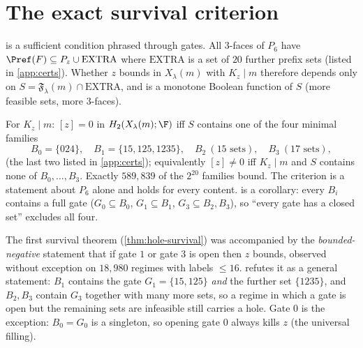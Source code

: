 \section{The exact survival criterion}
 is a sufficient condition phrased through gates. All 3-faces of $P_6$ have $\Pref(F)\subseteq P_z\cup\mathrm{EXTRA}$ where $\mathrm{EXTRA}$ is a set of $20$ further prefix sets (listed in \cref{app:certs}). Whether $z$ bounds in $X_\lambda(m)$ with $K_z\mid m$ therefore depends only on $S=\mathfrak F_\lambda(m)\cap\mathrm{EXTRA}$, and is a monotone Boolean function of $S$ (more feasible sets, more $3$-faces).
\begin{theorem}\label{thm:exact-survival}
For $K_z\mid m$: $[z]=0$ in $H_2(X_\lambda(m);\F)$ iff $S$ contains one of the four minimal families
\[
B_0=\{024\},\quad B_1=\{15,125,1235\},\quad B_2\ (15\text{ sets}),\quad B_3\ (17\text{ sets}),
\]
(the last two listed in \cref{app:certs}); equivalently $[z]\ne0$ iff $K_z\mid m$ and $S$ contains none of $B_0,\dots,B_3$. Exactly $589{,}839$ of the $2^{20}$ families bound. The criterion is a statement about $P_6$ alone and holds for every content.  is a corollary: every $B_i$ contains a full gate ($G_0\subseteq B_0$, $G_1\subseteq B_1$, $G_3\subseteq B_2,B_3$), so ``every gate has a closed set'' excludes all four.
\end{theorem}
\begin{remark}\label{rem:gate-correction}
The first survival theorem (\cref{thm:hole-survival}) was accompanied by the \emph{bounded-negative} statement that if gate $1$ or gate $3$ is open then $z$ bounds, observed without exception on $18{,}980$ regimes with labels $\le16$.  refutes it as a general statement: $B_1$ contains the gate $G_1=\{15,125\}$ \emph{and} the further set $\{1235\}$, and $B_2,B_3$ contain $G_3$ together with many more sets, so a regime in which a gate is open but the remaining sets are infeasible still carries a hole. Gate $0$ is the exception: $B_0=G_0$ is a singleton, so opening gate $0$ always kills $z$ (the universal filling).
\end{remark}
